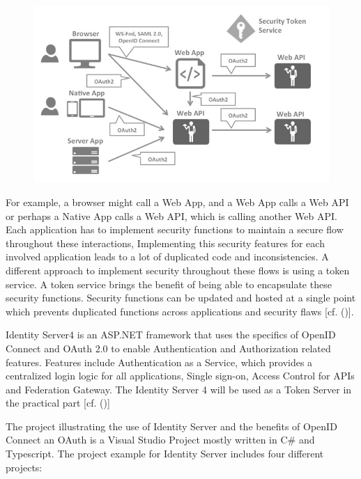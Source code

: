 \begin{figure}[h]
	\centering
	\includegraphics[width=0.8\linewidth]{images/architecture-identityserver}
	\caption[Architecture IdentityServer4]{}
	\caption{}
	\label{fig:architecture-identityserver}
\end{figure}



For example, a browser might call a Web App, and a Web App calls a Web API or perhaps a Native App calls a Web API, which is calling another Web API. Each application has to implement security functions to maintain a secure flow throughout these interactions, Implementing this security features for each involved application leads to a lot of duplicated code and inconsistencies. A different approach to implement security throughout these flows is using a token service. A token service brings the benefit of being able to encapsulate these security functions. Security functions can be updated and hosted at a single point which prevents duplicated functions across applications and security flaws [cf. (\cite{Sakimura:2014:OpenIDConnect})].

Identity Server4 is an ASP.NET framework that uses the specifics of OpenID Connect and OAuth 2.0 to enable Authentication and Authorization related features. Features include Authentication as a Service, which provides a centralized login logic for all applications, Single sign-on, Access Control for APIs and Federation Gateway. The Identity Server 4 will be used as a Token Server in the practical part [cf. (\cite{Brock:2018:ID4})]

The project illustrating the use of Identity Server and the benefits of OpenID Connect an OAuth is a Visual Studio Project mostly written in C\# and Typescript. The project example for Identity Server includes four different projects:

